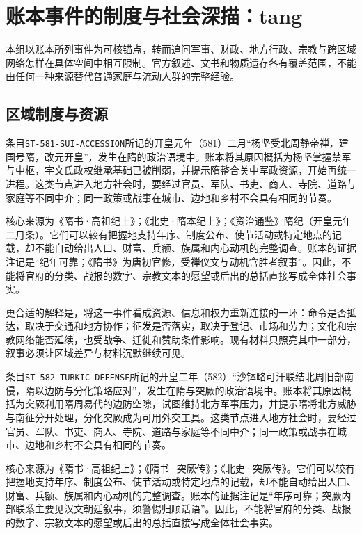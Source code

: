 \section{账本事件的制度与社会深描：tang}

\label{sec:ledger-depth-tang}

本组以账本所列事件为可核锚点，转而追问军事、财政、地方行政、宗教与跨区域网络怎样在具体空间中相互限制。官方叙述、文书和物质遗存各有覆盖范围，不能由任何一种来源替代普通家庭与流动人群的完整经验。

\subsection{区域制度与资源}

条目\texttt{ST-581-SUI-ACCESSION}所记的开皇元年（581）二月“杨坚受北周静帝禅，建国号隋，改元开皇”，发生在隋的政治语境中。账本将其原因概括为杨坚掌握禁军与中枢，宇文氏政权继承基础已被削弱，并提示隋整合关中军政资源，开始再统一进程。这类节点进入地方社会时，要经过官员、军队、书吏、商人、寺院、道路与家庭等不同中介；同一政策或战事在城市、边地和乡村不会具有相同的节奏。

核心来源为《隋书·高祖纪上》；《北史·隋本纪上》；《资治通鉴》隋纪（开皇元年二月条）。它们可以较有把握地支持年序、制度公布、使节活动或特定地点的记载，却不能自动给出人口、财富、兵额、族属和内心动机的完整调查。账本的证据注记是“纪年可靠；《隋书》为唐初官修，受禅仪文与动机含胜者叙事”。因此，不能将官府的分类、战报的数字、宗教文本的愿望或后出的总括直接写成全体社会事实。

更合适的解释是，将这一事件看成资源、信息和权力重新连接的一环：命令是否抵达，取决于交通和地方协作；征发是否落实，取决于登记、市场和劳力；文化和宗教网络能否延续，也受战争、迁徙和赞助条件影响。现有材料只照亮其中一部分，叙事必须让区域差异与材料沉默继续可见。

条目\texttt{ST-582-TURKIC-DEFENSE}所记的开皇二年（582）“沙钵略可汗联结北周旧部南侵，隋以边防与分化策略应对”，发生在隋与突厥的政治语境中。账本将其原因概括为突厥利用隋周易代的边防空隙，试图维持北方军事压力，并提示隋将北方威胁与南征分开处理，分化突厥成为可用外交工具。这类节点进入地方社会时，要经过官员、军队、书吏、商人、寺院、道路与家庭等不同中介；同一政策或战事在城市、边地和乡村不会具有相同的节奏。

核心来源为《隋书·高祖纪上》；《隋书·突厥传》；《北史·突厥传》。它们可以较有把握地支持年序、制度公布、使节活动或特定地点的记载，却不能自动给出人口、财富、兵额、族属和内心动机的完整调查。账本的证据注记是“年序可靠；突厥内部联系主要见汉文朝廷叙事，须警惕归顺话语”。因此，不能将官府的分类、战报的数字、宗教文本的愿望或后出的总括直接写成全体社会事实。

